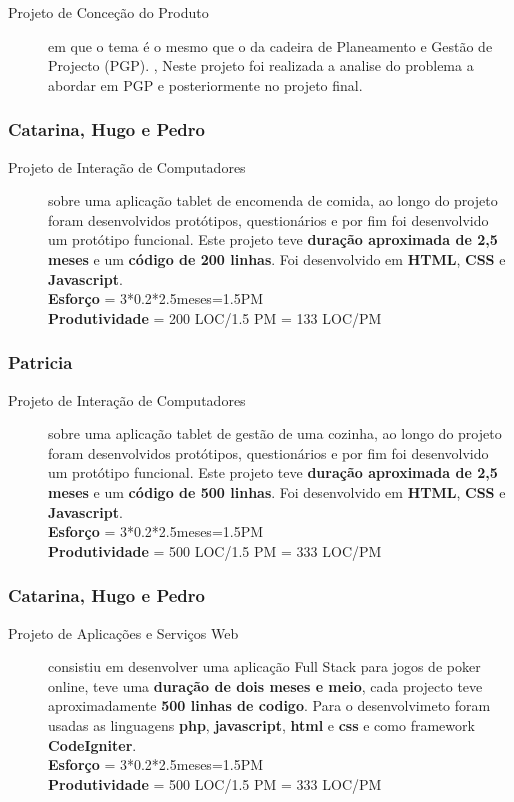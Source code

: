 \documentclass[a4paper]{report}
\begin{document}
\begin{description}
    \item[Projeto de Conceção do Produto] em que o tema é o mesmo que o da cadeira de Planeamento e Gestão de Projecto (PGP). , Neste projeto foi realizada a analise do problema a abordar em PGP e posteriormente no projeto final.
\end{description}

\subsubsection*{Catarina, Hugo e Pedro} 
\begin{description}
    \item[Projeto de Interação de Computadores] sobre uma aplicação tablet de encomenda de comida, ao longo do projeto foram desenvolvidos protótipos, questionários e por fim foi desenvolvido um protótipo funcional. Este projeto teve \textbf{duração aproximada de 2,5 meses} e um \textbf{código de 200 linhas}. Foi desenvolvido em \textbf{HTML}, \textbf{CSS} e \textbf{Javascript}.\\\textbf{Esforço} = 3*0.2*2.5meses=1.5PM\\ \textbf{Produtividade} = 200 LOC/1.5 PM = 133 LOC/PM
\end{description}

\subsubsection*{Patricia} 
\begin{description}
    \item[Projeto de Interação de Computadores] sobre uma aplicação tablet de gestão de uma cozinha, ao longo do projeto foram desenvolvidos protótipos, questionários e por fim foi desenvolvido um protótipo funcional. Este projeto teve \textbf{duração aproximada de 2,5 meses} e um \textbf{código de 500 linhas}. Foi desenvolvido em \textbf{HTML}, \textbf{CSS} e \textbf{Javascript}.\\\textbf{Esforço} = 3*0.2*2.5meses=1.5PM\\ \textbf{Produtividade} = 500 LOC/1.5 PM = 333 LOC/PM
\end{description}

\subsubsection*{Catarina, Hugo e Pedro}
\begin{description}
    \item[Projeto de Aplicações e Serviços Web] consistiu em desenvolver uma aplicação Full Stack para jogos de poker online, teve uma \textbf{duração de dois meses e meio}, cada projecto teve aproximadamente \textbf{500 linhas de codigo}. Para o desenvolvimeto foram usadas as linguagens \textbf{php}, \textbf{javascript}, \textbf{html} e \textbf{css} e como framework \textbf{CodeIgniter}.\\\textbf{Esforço} = 3*0.2*2.5meses=1.5PM\\ \textbf{Produtividade} = 500 LOC/1.5 PM = 333 LOC/PM
\end{description}
\end{document}
